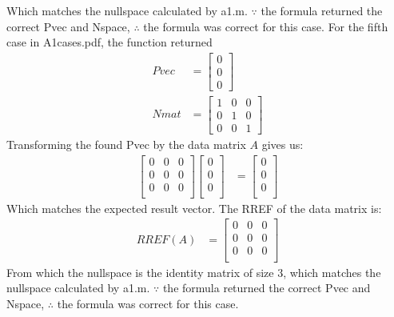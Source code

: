 \documentclass{article}
\begin{document}
	Which matches the nullspace calculated by a1.m. $\because$ the formula returned the correct Pvec and Nspace, $\therefore$ the formula was correct for this case. For the fifth case in A1cases.pdf, the function returned
		\begin{align*}
			Pvec &= \left[\begin{matrix}
				0\\
				0\\
				0
			\end{matrix}\right]\\
			Nmat &= \left[\begin{matrix}
				1 & 0 & 0\\
				0 & 1 & 0\\
				0 & 0 & 1
			\end{matrix}\right]
		\end{align*}
	Transforming the found Pvec by the data matrix $A$ gives us:
		\begin{align*}
			\left[\begin{matrix}
				0 & 0 & 0\\
				0 & 0 & 0\\
				0 & 0 & 0\\
			\end{matrix}\right]\left[\begin{matrix}
				0\\
				0\\
				0\\
			\end{matrix}\right] &= \left[\begin{matrix}
				0\\
				0\\
				0\\
			\end{matrix}\right]
		\end{align*}
	Which matches the expected result vector. The RREF of the data matrix is:
		\begin{align*}
			RREF(A) &= \left[\begin{matrix}
				0 & 0 & 0\\
				0 & 0 & 0\\
				0 & 0 & 0\\
			\end{matrix}\right]
		\end{align*}
	From which the nullspace is the identity matrix of size 3, which matches the nullspace calculated by a1.m. $\because$ the formula returned the correct Pvec and Nspace, $\therefore$ the formula was correct for this case.
\end{document}
